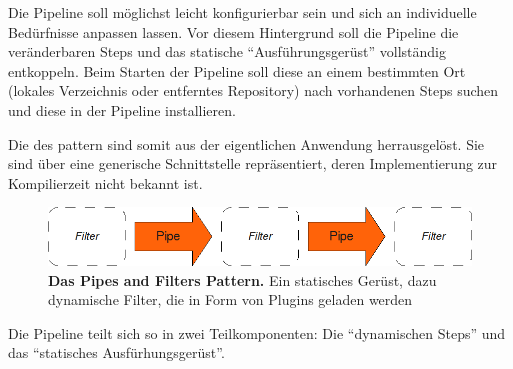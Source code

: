 Die Pipeline soll möglichst leicht konfigurierbar sein und sich an
individuelle Bedürfnisse anpassen lassen.
Vor diesem Hintergrund soll die Pipeline die veränderbaren Steps und das
statische \enquote{Ausführungsgerüst} vollständig entkoppeln. Beim Starten der
Pipeline soll diese an einem bestimmten Ort (lokales Verzeichnis oder
entferntes Repository) nach vorhandenen Steps suchen und diese in der Pipeline
installieren.

Die  des  pattern sind somit aus der
eigentlichen Anwendung herrausgelöst. Sie sind über eine generische
Schnittstelle repräsentiert, deren Implementierung zur Kompilierzeit nicht
bekannt ist.

\begin{figure}[htbp]
	\begin{center}
		\includegraphics[scale=0.7]{pics/pipesFilter21.png}
	\caption[Pipes and Filter 2]{
	\textbf{Das Pipes and Filters Pattern.}
	Ein statisches Gerüst, dazu dynamische Filter, die in Form von Plugins geladen
	werden }
	\end{center}
	\label{fig:pipesFilter21}
\end{figure}

Die Pipeline teilt sich so in zwei Teilkomponenten:
Die \enquote{dynamischen Steps} und das \enquote{statisches Ausfürhungsgerüst}.